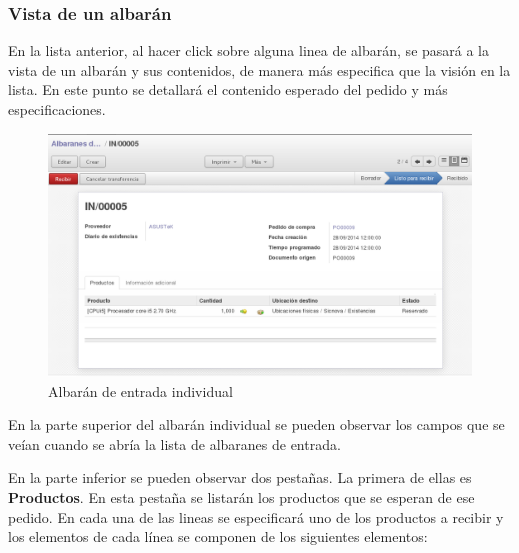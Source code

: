 \vspace{0.5cm}


\subsubsection{Vista de un albarán}

En la lista anterior, al hacer click sobre alguna linea de albarán, se pasará a la vista de un albarán y sus contenidos, de manera más especifica que la visión en la lista. En este punto se detallará el contenido esperado del pedido y más especificaciones.

\begin{figure}[H]
\includegraphics[width=\textwidth]{almacen/img/alb_entrada_i.png}
\caption{Albarán de entrada individual}
\end{figure}

En la parte superior del albarán individual se pueden observar los campos que se veían cuando se abría la lista de albaranes de entrada.

En la parte inferior se pueden observar dos pestañas. La primera de ellas es \textbf{Productos}. En esta pestaña se listarán los productos que se esperan de ese pedido. En cada una de las lineas se especificará uno de los productos a recibir y los elementos de cada línea se componen de los siguientes elementos:

